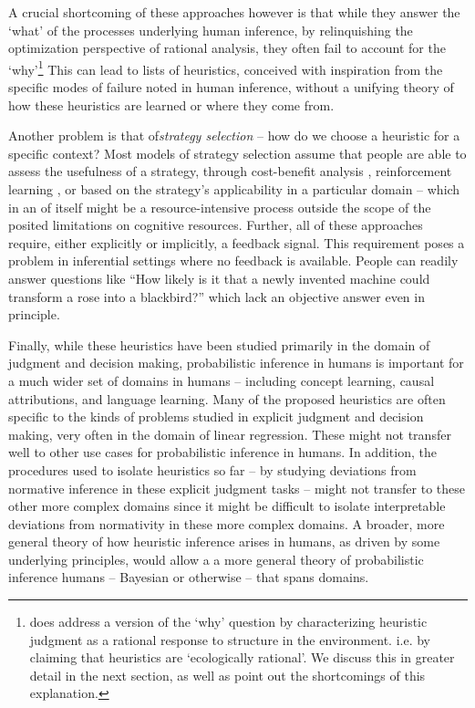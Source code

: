 A crucial shortcoming of these approaches however is that while they answer the `what' of the processes underlying human inference, by relinquishing the optimization perspective of rational analysis, they often fail to account for the `why'\footnote{\citet{gigerenzer2008heuristics} does address a version of the `why' question by characterizing heuristic judgment as a rational response to structure in the environment. i.e. by claiming that heuristics are `ecologically rational'. We discuss this in greater detail in the next section, as well as point out the shortcomings of this explanation.} This can lead to lists of heuristics, conceived with inspiration from the specific modes of failure noted in human inference, without a unifying theory of how these heuristics are learned or where they come from. 

Another problem is that of\emph{strategy selection} \citep{gigerenzer2008heuristics, marewski2014strategy} -- how do we choose a heuristic for a specific context? Most models of strategy selection assume that people are able to assess the usefulness of a strategy, through cost-benefit analysis \citep{johnson85, beach1978contingency, lieder2017strategy}, reinforcement learning \citep{erev05, rieskamp06}, or based on the strategy's applicability in a particular domain \citep{marewski2011cognitive, schulz2016simple} -- which in an of itself might be a resource-intensive process outside the scope of the posited limitations on cognitive resources. Further, all of these approaches require, either explicitly or implicitly, a feedback signal. This requirement poses a problem in inferential settings where no feedback is available. People can readily answer questions like ``How likely is it that a newly invented machine could transform a rose into a blackbird?'' \citep{Griffiths15} which lack an objective answer even in principle. 

Finally, while these heuristics have been studied primarily in the domain of judgment and decision making, probabilistic inference in humans is important for a much wider set of domains in humans -- including concept learning, causal attributions, and language learning. Many of the proposed heuristics are often specific to the kinds of problems studied in explicit judgment and decision making, very often in the domain of linear regression. These might not transfer well to other use cases for probabilistic inference in humans. In addition, the procedures used to isolate heuristics so far -- by studying deviations from normative inference in these explicit judgment tasks -- might not transfer to these other more complex domains since it might be difficult to isolate interpretable deviations from normativity in these more complex domains. A broader, more general theory of how heuristic inference arises in humans, as driven by some underlying principles, would allow a a more general theory of probabilistic inference humans -- Bayesian or otherwise -- that spans domains.


